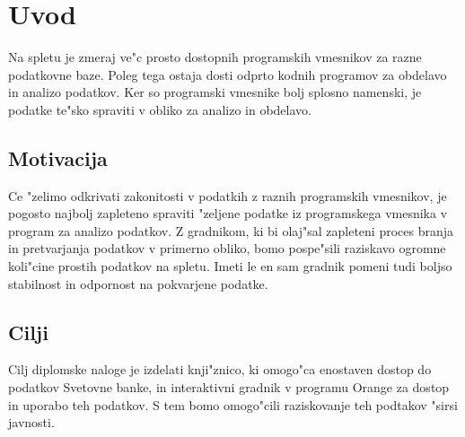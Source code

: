\chapter{Uvod}

Na spletu je zmeraj ve"c prosto dostopnih programskih vmesnikov za razne
podatkovne baze. Poleg tega ostaja dosti odprto kodnih programov za obdelavo 
in analizo podatkov. Ker so programski vmesnike bolj splosno namenski, je
podatke te"sko spraviti v obliko za analizo in obdelavo.



\section{Motivacija}

Ce "zelimo odkrivati zakonitosti v podatkih z raznih programskih vmesnikov, je
pogosto najbolj zapleteno spraviti "zeljene podatke iz programskega vmesnika v
program za analizo podatkov. Z gradnikom, ki bi olaj"sal zapleteni proces
branja in pretvarjanja podatkov v primerno obliko, bomo pospe"sili raziskavo
ogromne koli"cine prostih podatkov na spletu. Imeti le en sam gradnik pomeni
tudi boljso stabilnost in odpornost na pokvarjene podatke.



\section{Cilji}

Cilj diplomske naloge je izdelati knji"znico, ki omogo"ca enostaven dostop do
podatkov Svetovne banke, in interaktivni gradnik v programu Orange za dostop in
uporabo teh podatkov. S tem bomo omogo"cili raziskovanje teh podtakov "sirsi
javnosti.

